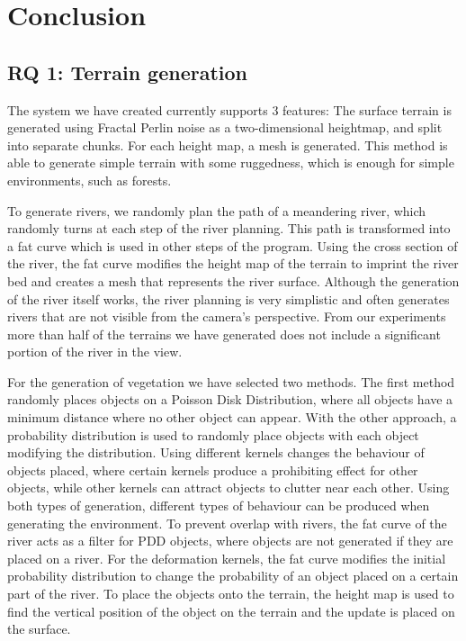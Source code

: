 \section{Conclusion}


\subsection{RQ 1: Terrain generation}
The system we have created currently supports 3 features: The surface terrain is generated using Fractal Perlin noise as a two-dimensional heightmap, and split into separate chunks. For each height map, a mesh is generated. This method is able to generate simple terrain with some ruggedness, which is enough for simple environments, such as forests.

To generate rivers, we randomly plan the path of a meandering river, which randomly turns at each step of the river planning. This path is transformed into a fat curve which is used in other steps of the program. Using the cross section of the river, the fat curve modifies the height map of the terrain to imprint the river bed and creates a mesh that represents the river surface. Although the generation of the river itself works, the river planning is very simplistic and often generates rivers that are not visible from the camera's perspective. From our experiments more than half of the terrains we have generated does not include a significant portion of the river in the view.

For the generation of vegetation we have selected two methods. The first method randomly places objects on a Poisson Disk Distribution, where all objects have a minimum distance where no other object can appear. With the other approach, a probability distribution is used to randomly place objects with each object modifying the distribution. Using different kernels changes the behaviour of objects placed, where certain kernels produce a prohibiting effect for other objects, while other kernels can attract objects to clutter near each other. Using both types of generation, different types of behaviour can be produced when generating the environment. To prevent overlap with rivers, the fat curve of the river acts as a filter for PDD objects, where objects are not generated if they are placed on a river. For the deformation kernels, the fat curve modifies the initial probability distribution to change the probability of an object placed on a certain part of the river. To place the objects onto the terrain, the height map is used to find the vertical position of the object on the terrain and the update is placed on the surface.


